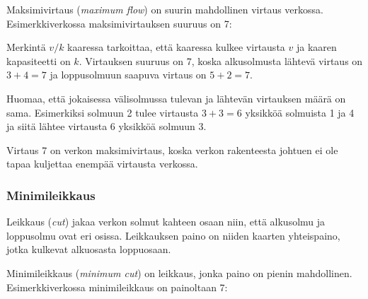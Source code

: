 Maksimivirtaus (\textit{maximum flow}) on suurin
mahdollinen virtaus verkossa.
Esimerkkiverkossa maksimivirtauksen suuruus on 7:

\begin{center}
\end{center}

Merkintä $v/k$ kaaressa tarkoittaa,
että kaaressa kulkee virtausta $v$
ja kaaren kapasiteetti on $k$.
Virtauksen suuruus on 7, koska alkusolmusta
lähtevä virtaus on $3+4=7$ ja loppusolmuun
saapuva virtaus on $5+2=7$.

Huomaa, että jokaisessa välisolmussa tulevan ja
lähtevän virtauksen määrä on sama.
Esimerkiksi solmuun 2 tulee virtausta $3+3=6$ yksikköä solmuista 1 ja 4
ja siitä lähtee virtausta $6$ yksikköä solmuun 3.

Virtaus 7 on verkon maksimivirtaus, koska verkon
rakenteesta johtuen ei ole tapaa
kuljettaa enempää virtausta verkossa.

\subsubsection{Minimileikkaus}

Leikkaus (\textit{cut}) jakaa verkon solmut
kahteen osaan niin, että alkusolmu ja loppusolmu
ovat eri osissa.
Leikkauksen paino on niiden kaarten yhteispaino,
jotka kulkevat alkuosasta loppuosaan.

Minimileikkaus (\textit{minimum cut})
on leikkaus, jonka paino on pienin mahdollinen.
Esimerkkiverkossa minimileikkaus on painoltaan 7:

